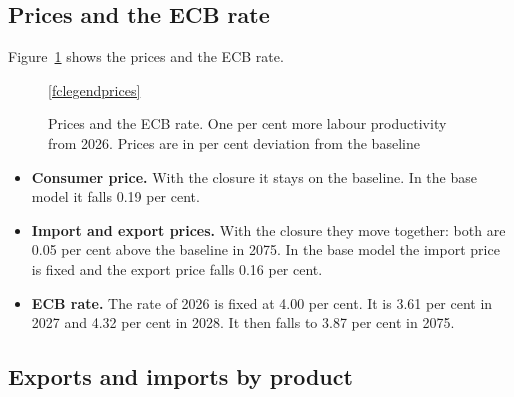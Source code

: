 \documentclass[11pt,a4paper]{article}
\begin{document}
\FloatBarrier
\subsection{Prices and the ECB rate}

Figure~\ref{fig:prices} shows the prices and the ECB rate.

\begin{figure}[!ht]
\centering
{}

\ref{fclegendprices}
\caption{Prices and the ECB rate. One per cent more labour productivity from 2026. Prices are in per cent deviation from the baseline}
\label{fig:prices}
\end{figure}

\begin{itemize}
\item \textbf{Consumer price.} With the closure it stays on the baseline. In the base model it falls 0.19 per cent.
\item \textbf{Import and export prices.} With the closure they move together: both are 0.05 per cent above the baseline in 2075. In the base model the import price is fixed and the export price falls 0.16 per cent.
\item \textbf{ECB rate.} The rate of 2026 is fixed at 4.00 per cent. It is 3.61 per cent in 2027 and 4.32 per cent in 2028. It then falls to 3.87 per cent in 2075.
\end{itemize}

\FloatBarrier
\subsection{Exports and imports by product}
\end{document}
